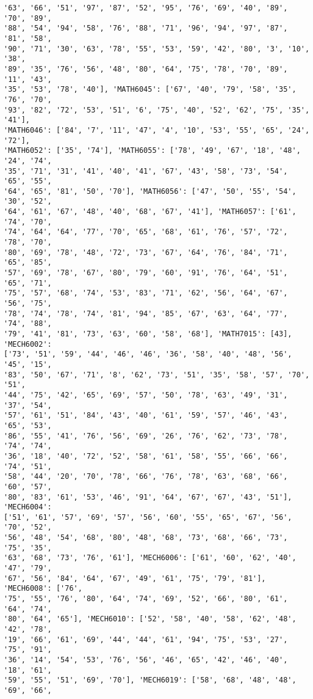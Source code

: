 \documentclass[11pt]{article}
\begin{document}
\begin{Verbatim}[commandchars=\\\{\}]
'63', '66', '51', '97', '87', '52', '95', '76', '69', '40', '89', '70', '89',
'88', '54', '94', '58', '76', '88', '71', '96', '94', '97', '87', '81', '58',
'90', '71', '30', '63', '78', '55', '53', '59', '42', '80', '3', '10', '38',
'89', '35', '76', '56', '48', '80', '64', '75', '78', '70', '89', '11', '43',
'35', '53', '78', '40'], 'MATH6045': ['67', '40', '79', '58', '35', '76', '70',
'93', '82', '72', '53', '51', '6', '75', '40', '52', '62', '75', '35', '41'],
'MATH6046': ['84', '7', '11', '47', '4', '10', '53', '55', '65', '24', '72'],
'MATH6052': ['35', '74'], 'MATH6055': ['78', '49', '67', '18', '48', '24', '74',
'35', '71', '31', '41', '40', '41', '67', '43', '58', '73', '54', '65', '55',
'64', '65', '81', '50', '70'], 'MATH6056': ['47', '50', '55', '54', '30', '52',
'64', '61', '67', '48', '40', '68', '67', '41'], 'MATH6057': ['61', '74', '70',
'74', '64', '64', '77', '70', '65', '68', '61', '76', '57', '72', '78', '70',
'80', '69', '78', '48', '72', '73', '67', '64', '76', '84', '71', '65', '85',
'57', '69', '78', '67', '80', '79', '60', '91', '76', '64', '51', '65', '71',
'75', '57', '68', '74', '53', '83', '71', '62', '56', '64', '67', '56', '75',
'78', '74', '78', '74', '81', '94', '85', '67', '63', '64', '77', '74', '88',
'79', '41', '81', '73', '63', '60', '58', '68'], 'MATH7015': [43], 'MECH6002':
['73', '51', '59', '44', '46', '46', '36', '58', '40', '48', '56', '45', '15',
'83', '50', '67', '71', '8', '62', '73', '51', '35', '58', '57', '70', '51',
'44', '75', '42', '65', '69', '57', '50', '78', '63', '49', '31', '37', '54',
'57', '61', '51', '84', '43', '40', '61', '59', '57', '46', '43', '65', '53',
'86', '55', '41', '76', '56', '69', '26', '76', '62', '73', '78', '74', '74',
'36', '18', '40', '72', '52', '58', '61', '58', '55', '66', '66', '74', '51',
'58', '44', '20', '70', '78', '66', '76', '78', '63', '68', '66', '60', '57',
'80', '83', '61', '53', '46', '91', '64', '67', '67', '43', '51'], 'MECH6004':
['51', '61', '57', '69', '57', '56', '60', '55', '65', '67', '56', '70', '52',
'56', '48', '54', '68', '80', '48', '68', '73', '68', '66', '73', '75', '35',
'63', '68', '73', '76', '61'], 'MECH6006': ['61', '60', '62', '40', '47', '79',
'67', '56', '84', '64', '67', '49', '61', '75', '79', '81'], 'MECH6008': ['76',
'75', '55', '76', '80', '64', '74', '69', '52', '66', '80', '61', '64', '74',
'80', '64', '65'], 'MECH6010': ['52', '58', '40', '58', '62', '48', '42', '78',
'19', '66', '61', '69', '44', '44', '61', '94', '75', '53', '27', '75', '91',
'36', '14', '54', '53', '76', '56', '46', '65', '42', '46', '40', '18', '61',
'59', '55', '51', '69', '70'], 'MECH6019': ['58', '68', '48', '48', '69', '66',

\end{Verbatim}
\end{document}
